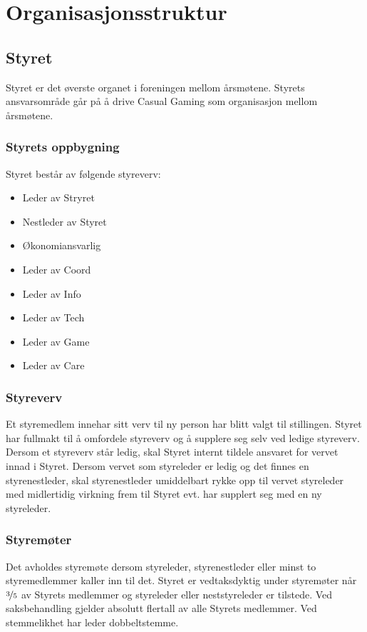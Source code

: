 \chapter{Organisasjonsstruktur}

\section{Styret}
Styret er det øverste organet i foreningen mellom årsmøtene. Styrets ansvarsområde går på å drive Casual Gaming som organisasjon mellom årsmøtene.

\subsection{Styrets oppbygning}
Styret består av følgende styreverv:
\begin{itemize}
    \item Leder av Stryret
    \item Nestleder av Styret
    \item Økonomiansvarlig
    \item Leder av Coord
    \item Leder av Info
    \item Leder av Tech
    \item Leder av Game
    \item Leder av Care
\end{itemize}

\subsection{Styreverv}
Et styremedlem innehar sitt verv til ny person har blitt valgt til stillingen. Styret har fullmakt til å omfordele styreverv og å supplere seg selv ved ledige styreverv. Dersom et styreverv står ledig, skal Styret internt tildele ansvaret for vervet innad i Styret. Dersom vervet som styreleder er ledig og det finnes en styrenestleder, skal styrenestleder umiddelbart rykke opp til vervet styreleder med midlertidig virkning frem til Styret evt. har supplert seg med en ny styreleder.

\subsection{Styremøter}
Det avholdes styremøte dersom styreleder, styrenestleder eller minst to styremedlemmer kaller inn til det. Styret er vedtaksdyktig under styremøter når $\nicefrac{3}{5}$ av Styrets medlemmer og styreleder eller neststyreleder er tilstede. Ved saksbehandling gjelder absolutt flertall av alle Styrets medlemmer. Ved stemmelikhet har leder dobbeltstemme.


